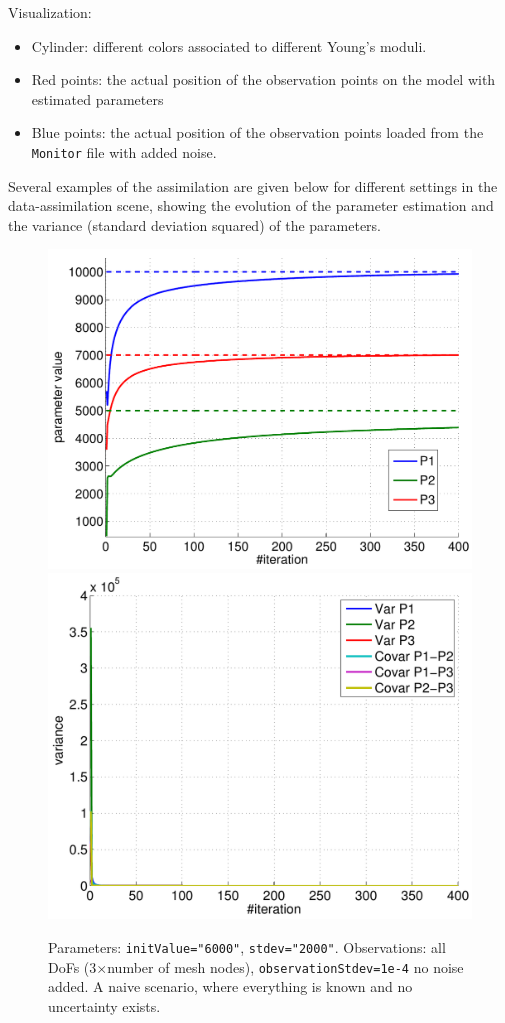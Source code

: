 \documentclass[10pt]{article}
\begin{document}
 Visualization:
 \begin{itemize}
  \item Cylinder: different colors associated to different Young's moduli. 
  \item Red points: the actual position of the observation points on the model with estimated parameters  
  \item Blue points: the actual position of the observation points loaded from the \texttt{Monitor} file with added noise.
 \end{itemize}
 

Several examples of the assimilation are given below for different settings in the data-assimilation scene, showing the evolution of the parameter
estimation and the variance (standard deviation squared) of the 
parameters.


\begin{figure}[ht]
\begin{center}
\includegraphics[width=.49\linewidth]{figures/p1_estim.pdf}
\hfill
\includegraphics[width=.49\linewidth]{figures/p1_var.pdf}
\caption{Parameters: \texttt{initValue="6000"}, \texttt{stdev="2000"}. Observations: all DoFs (3$\times$number of mesh nodes),
\texttt{observationStdev=1e-4} no noise added. A naive scenario, where everything is known and no uncertainty exists.}
\label{fig:Results1}
\end{center}
\end{figure}
\end{document}
